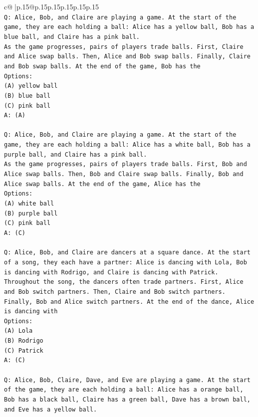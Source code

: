 \documentclass{article}
\begin{document}
{\begin{supertabular}{c@{$\;$}|p{.15\linewidth}@{}p{.15\linewidth}p{.15\linewidth}p{.15\linewidth}p{.15\linewidth}p{.15\linewidth}}
{{{\\ 
\texttt{Q: Alice, Bob, and Claire are playing a game. At the start of the game, they are each holding a ball: Alice has a yellow ball, Bob has a blue ball, and Claire has a pink ball.} \\
\texttt{As the game progresses, pairs of players trade balls. First, Claire and Alice swap balls. Then, Alice and Bob swap balls. Finally, Claire and Bob swap balls. At the end of the game, Bob has the} \\
\texttt{Options:} \\
\texttt{(A) yellow ball} \\
\texttt{(B) blue ball} \\
\texttt{(C) pink ball} \\
\texttt{A: (A)} \\
\\ 
\texttt{Q: Alice, Bob, and Claire are playing a game. At the start of the game, they are each holding a ball: Alice has a white ball, Bob has a purple ball, and Claire has a pink ball.} \\
\texttt{As the game progresses, pairs of players trade balls. First, Bob and Alice swap balls. Then, Bob and Claire swap balls. Finally, Bob and Alice swap balls. At the end of the game, Alice has the} \\
\texttt{Options:} \\
\texttt{(A) white ball} \\
\texttt{(B) purple ball} \\
\texttt{(C) pink ball} \\
\texttt{A: (C)} \\
\\ 
\texttt{Q: Alice, Bob, and Claire are dancers at a square dance. At the start of a song, they each have a partner: Alice is dancing with Lola, Bob is dancing with Rodrigo, and Claire is dancing with Patrick.} \\
\texttt{Throughout the song, the dancers often trade partners. First, Alice and Bob switch partners. Then, Claire and Bob switch partners. Finally, Bob and Alice switch partners. At the end of the dance, Alice is dancing with} \\
\texttt{Options:} \\
\texttt{(A) Lola} \\
\texttt{(B) Rodrigo} \\
\texttt{(C) Patrick} \\
\texttt{A: (C)} \\
\\ 
\texttt{Q: Alice, Bob, Claire, Dave, and Eve are playing a game. At the start of the game, they are each holding a ball: Alice has a orange ball, Bob has a black ball, Claire has a green ball, Dave has a brown ball, and Eve has a yellow ball.} \\
}}}
\end{supertabular}}
\end{document}

